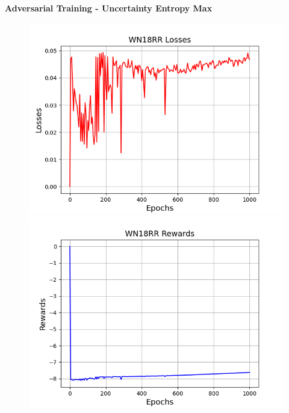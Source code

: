 \textbf{Adversarial Training - Uncertainty Entropy Max}\\
\begin{figure}
    \centering
    \begin{minipage}{.5\textwidth}
      \centering
      \includegraphics[width=0.9\linewidth]{figures/results/WN18RR/AdversarialTraining/Uncertainty/Max_Entropy/gan_train_wn18rr_losses.png}
    \end{minipage}%
    \begin{minipage}{.5\textwidth}
      \centering
      \includegraphics[width=0.9\linewidth]{figures/results/WN18RR/AdversarialTraining/Uncertainty/Max_Entropy/gan_train_wn18rr_rewards.png}
    \end{minipage}
    \begin{minipage}{.5\textwidth}
      \centering

\end{minipage}
\end{figure}
